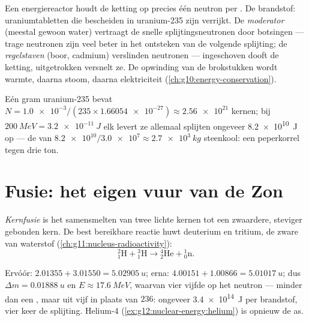 \begin{definition}\label{def:g12:nuclear-energy:reactor}
Een energiereactor houdt de ketting op precies één neutron per .
De brandstof: uraniumtabletten die bescheiden in uranium-235 zijn verrijkt. De
\emph{moderator} (meestal gewoon water) vertraagt de snelle
splijtingsneutronen door botsingen --- trage neutronen zijn veel beter in het
ontsteken van de volgende splijting; de
\emph{regelstaven} (boor, cadmium) verslinden neutronen ---
ingeschoven dooft de ketting, uitgetrokken versnelt ze. De opwinding van de
brokstukken wordt warmte, daarna stoom, daarna elektriciteit
(\cref{ch:g10:energy-conservation}).
\end{definition}

\begin{example}\label{ex:g12:nuclear-energy:gram}
Eén gram uranium-235 bevat
$N = \num{1.0e-3} / (235 \times \num{1.66054e-27}) \approx \num{2.56e21}$
kernen; bij $\qty{200}{MeV} = \qty{3.2e-11}{J}$ elk levert ze allemaal
splijten ongeveer \qty{8.2e10}{J} op --- de  van
$\num{8.2e10} / \num{3.0e7} \approx \qty{2.7e3}{kg}$ steenkool: een
peperkorrel tegen drie ton.
\end{example}

\section{Fusie: het eigen vuur van de Zon}

\begin{definition}[Kernfusie]\label{def:g12:nuclear-energy:fusion}
\emph{Kernfusie} is het samensmelten van twee lichte kernen
tot een zwaardere, steviger gebonden kern. De best bereikbare reactie huwt
deuterium en tritium, de zware  van waterstof
(\cref{ch:g11:nucleus-radioactivity}):
\[
{}^{2}_{1}\mathrm{H} + {}^{3}_{1}\mathrm{H} \longrightarrow
{}^{4}_{2}\mathrm{He} + {}^{1}_{0}\mathrm{n}.
\]
\end{definition}

\begin{example}[D--T, gewogen]\label{ex:g12:nuclear-energy:dt}
Ervóór: $2.01355 + 3.01550 = \qty{5.02905}{u}$; erna:
$4.00151 + 1.00866 = \qty{5.01017}{u}$; dus $\Delta m = \qty{0.01888}{u}$ en
$E \approx \qty{17.6}{MeV}$, waarvan vier vijfde op het neutron --- minder dan
een , maar uit vijf  in plaats van $236$: ongeveer
\qty{3.4e14}{J} per  brandstof, vier keer de splijting. Helium-4
(\cref{ex:g12:nuclear-energy:helium}) is opnieuw de as.
\end{example}

